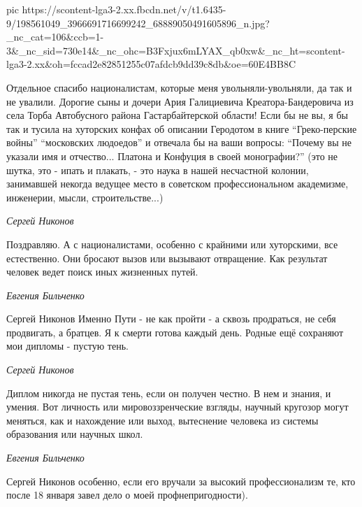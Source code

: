 \ifcmt
  pic https://scontent-lga3-2.xx.fbcdn.net/v/t1.6435-9/198561049_3966691716699242_68889050491605896_n.jpg?_nc_cat=106&ccb=1-3&_nc_sid=730e14&_nc_ohc=B3Fxjux6mLYAX_qb0xw&_nc_ht=scontent-lga3-2.xx&oh=fccad2e82851255c07afdcb9dd39c8db&oe=60E4BB8C
\fi

Отдельное спасибо националистам, которые меня увольняли-увольняли, да так и не
увалили. Дорогие сыны и дочери Ария Галициевича Креатора-Бандеровича из села
Торба Автобусного района Гастарбайтерской области!  Если бы не вы, я бы так и
тусила на хуторских конфах об описании Геродотом в книге \enquote{Греко-перские
войны} \enquote{московских людоедов} и отвечала бы на ваши вопросы:
\enquote{Почему вы не указали имя и отчество... Платона и Конфуция в своей
монографии?} (это не шутка, это - ипать и плакать, - это наука в нашей
несчастной колонии, занимавшей некогда ведущее место в советском
профессиональном академизме, инженерии, мысли, строительстве...)

\emph{Сергей Никонов}

Поздравляю. А с националистами, особенно с крайними или хуторскими, все
естественно. Они бросают вызов или вызывают отвращение. Как результат человек
ведет поиск иных жизненных путей.

\emph{Евгения Бильченко}

Сергей Никонов Именно Пути - не как пройти - а сквозь продраться, не себя
продвигать, а братцев. Я к смерти готова каждый день. Родные ещё сохраняют мои
дипломы - пустую тень.

\emph{Сергей Никонов}

Диплом никогда не пустая тень, если он получен честно. В нем и знания, и
умения. Вот личность или мировоззренческие взгляды, научный кругозор могут
меняться, как и нахождение или выход, вытеснение человека из системы
образования или научных школ.

\emph{Евгения Бильченко}

Сергей Никонов особенно, если его вручали за высокий профессионализм те, кто
после 18 января завел дело о моей профнепригодности).
